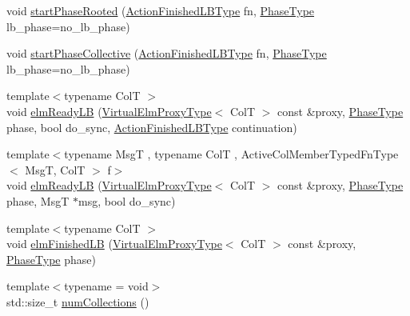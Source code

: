 \begin{DoxyCompactItemize}
\item 
void \hyperlink{structvt_1_1vrt_1_1collection_1_1_collection_manager_aa3fe8c93775fd9c4878968112503a428}{start\+Phase\+Rooted} (\hyperlink{structvt_1_1vrt_1_1collection_1_1_collection_manager_a2649daab7b437e1e2bdb5f2eefff29b6}{Action\+Finished\+L\+B\+Type} fn, \hyperlink{namespacevt_a46ce6733d5cdbd735d561b7b4029f6d7}{Phase\+Type} lb\+\_\+phase=no\+\_\+lb\+\_\+phase)
\item 
void \hyperlink{structvt_1_1vrt_1_1collection_1_1_collection_manager_af7522c6048b723201d966094adfefa94}{start\+Phase\+Collective} (\hyperlink{structvt_1_1vrt_1_1collection_1_1_collection_manager_a2649daab7b437e1e2bdb5f2eefff29b6}{Action\+Finished\+L\+B\+Type} fn, \hyperlink{namespacevt_a46ce6733d5cdbd735d561b7b4029f6d7}{Phase\+Type} lb\+\_\+phase=no\+\_\+lb\+\_\+phase)
\item 
{\footnotesize template$<$typename ColT $>$ }\\void \hyperlink{structvt_1_1vrt_1_1collection_1_1_collection_manager_a009a33f449e14d32d73aae33224298ef}{elm\+Ready\+LB} (\hyperlink{namespacevt_1_1vrt_a620a5c8c59d13e513f690c74b4af516f}{Virtual\+Elm\+Proxy\+Type}$<$ ColT $>$ const \&proxy, \hyperlink{namespacevt_a46ce6733d5cdbd735d561b7b4029f6d7}{Phase\+Type} phase, bool do\+\_\+sync, \hyperlink{structvt_1_1vrt_1_1collection_1_1_collection_manager_a2649daab7b437e1e2bdb5f2eefff29b6}{Action\+Finished\+L\+B\+Type} continuation)
\item 
{\footnotesize template$<$typename MsgT , typename ColT , Active\+Col\+Member\+Typed\+Fn\+Type$<$ Msg\+T, Col\+T $>$ f$>$ }\\void \hyperlink{structvt_1_1vrt_1_1collection_1_1_collection_manager_ae074993a281f67e9d661481d9aee886e}{elm\+Ready\+LB} (\hyperlink{namespacevt_1_1vrt_a620a5c8c59d13e513f690c74b4af516f}{Virtual\+Elm\+Proxy\+Type}$<$ ColT $>$ const \&proxy, \hyperlink{namespacevt_a46ce6733d5cdbd735d561b7b4029f6d7}{Phase\+Type} phase, MsgT $\ast$msg, bool do\+\_\+sync)
\item 
{\footnotesize template$<$typename ColT $>$ }\\void \hyperlink{structvt_1_1vrt_1_1collection_1_1_collection_manager_aa80bf07ee33e5e75de987ac82b79ae18}{elm\+Finished\+LB} (\hyperlink{namespacevt_1_1vrt_a620a5c8c59d13e513f690c74b4af516f}{Virtual\+Elm\+Proxy\+Type}$<$ ColT $>$ const \&proxy, \hyperlink{namespacevt_a46ce6733d5cdbd735d561b7b4029f6d7}{Phase\+Type} phase)
\item 
{\footnotesize template$<$typename  = void$>$ }\\std\+::size\+\_\+t \hyperlink{structvt_1_1vrt_1_1collection_1_1_collection_manager_a5b443b26d693a78b22234264fecf6832}{num\+Collections} ()

\end{DoxyCompactItemize}

